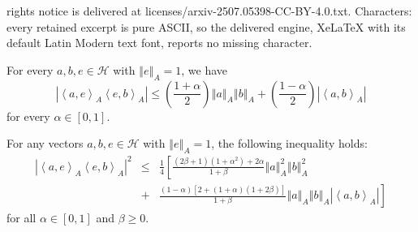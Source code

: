 \documentclass[10pt,a4paper]{amsart}
\newcommand {\h}{\mathcal{H}}
\newcommand{\abs}[1]{\left\vert#1\right\vert}
\newcommand{\bra}[1]{\left(#1\right)}
\newcommand{\normA}[1]{{\left\Vert#1\right\Vert}_{A}}
\newcommand{\seqA}[1]{{\left<#1\right>}_{A}}
\begin{document}
rights notice is delivered at licenses/arxiv-2507.05398-CC-BY-4.0.txt. Characters: every retained excerpt is pure ASCII, so the delivered engine, XeLaTeX with its default Latin Modern text font, reports no missing character.
\begin{lemma}\label{Lemma3.18} For every $a,b,e\in\h$ with $\normA{e}=1$, we have
\begin{equation}\label{MD1}
  \abs{\seqA{a,e}\seqA{e,b}}\leq \bra{\frac{1+\alpha}{2}}\normA{a}\normA{b}+\bra{\frac{1-\alpha}{2}}\abs{\seqA{a,b}}
\end{equation}
for every $\alpha\in [0,1]$.
\end{lemma}

\begin{lemma}\label{Lemma2.4}
For any vectors $a,b,e \in \h$ with $\normA{e} = 1$, the following inequality holds:
\begin{eqnarray}\label{eq:main_inequality}
  \abs{\seqA{a,e}\seqA{e,b}}^2 &\leq&\frac{1}{4}\left[\frac{(2\beta+1)(1+\alpha^2)+2\alpha}{1+\beta}\normA{a}^2\normA{b}^2\right.\nonumber \\
  &+&\left.\frac{(1-\alpha)[2+(1+\alpha)(1+2\beta)]}{1+\beta}\normA{a}\normA{b}\abs{\seqA{a,b}}\right]
\end{eqnarray}
for all $\alpha \in [0,1]$ and $\beta \geq 0$.
\end{lemma}
\end{document}

